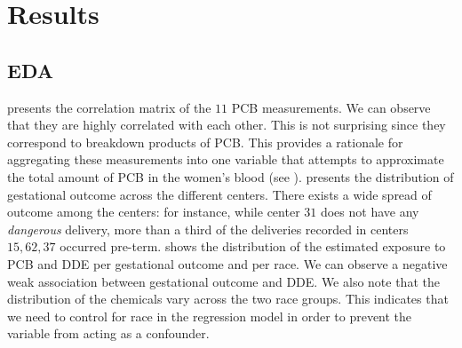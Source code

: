 \documentclass[10pt]{jmlr}%
\begin{document}
\section{Results}
\label{sec:results}

\subsection{EDA}

 presents the correlation matrix of the $11$ PCB measurements. We can observe that they are highly correlated with each other. This is not surprising since they correspond to breakdown products of PCB. This provides a rationale for aggregating these measurements into one variable that attempts to approximate the total amount of PCB in the women's blood (see ).  presents the distribution of gestational outcome across the different centers. There exists a wide spread of outcome among the centers: for instance, while center $31$ does not have any \textit{dangerous} delivery, more than a third of the deliveries recorded in centers $15, 62, 37$ occurred pre-term.  shows the distribution of the estimated exposure to PCB and DDE per gestational outcome and per race. We can observe a negative weak association between gestational outcome and DDE. We also note that the distribution of the chemicals vary across the two race groups. This indicates that we need to control for race in the regression model in order to prevent the variable from acting as a confounder.


\end{document}
